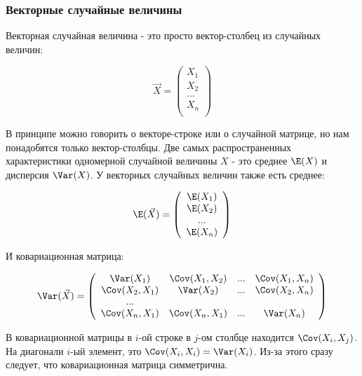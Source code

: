\subsubsection*{Векторные случайные величины}

Векторная случайная величина - это просто вектор-столбец из случайных величин:

\begin{equation}
\vec{X}=\left(\begin{array}{c} X_{1} \\ X_{2} \\ ... \\ X_{n} \\  \end{array} \right)
\end{equation}

В принципе можно говорить о векторе-строке или о случайной матрице, но нам понадобятся только вектор-столбцы. Две самых распространенных характеристики одномерной случайной величины $X$ - это среднее $\E(X)$ и дисперсия $\Var(X)$.
У векторных случайных величин также есть среднее:

\begin{equation}
\E(\vec{X})=\left(\begin{array}{c} \E(X_{1}) \\ \E(X_{2}) \\ ... \\ \E(X_{n}) \\  \end{array} \right)
\end{equation}



И ковариационная матрица:

\begin{equation}
\Var(\vec{X})=\left(
\begin{array}{cccc} 
\Var(X_{1}) & \Cov(X_{1},X_{2}) & ... & \Cov(X_{1},X_{n}) \\ 
\Cov(X_{2},X_{1}) & \Var(X_{2}) & ... & \Cov(X_{2},X_{n}) \\ 
... &&&\\ 
\Cov(X_{n},X_{1}) & \Cov(X_{n},X_{1})  & ... & \Var(X_{n})\\ 
\end{array} 
\right)
\end{equation}

В ковариационной матрицы в $i$-ой строке в $j$-ом столбце находится $\Cov(X_{i},X_{j})$. На диагонали $i$-ый элемент, это $\Cov(X_{i},X_{i})=\Var(X_{i})$. Из-за этого сразу следует, что ковариационная матрица симметрична.

